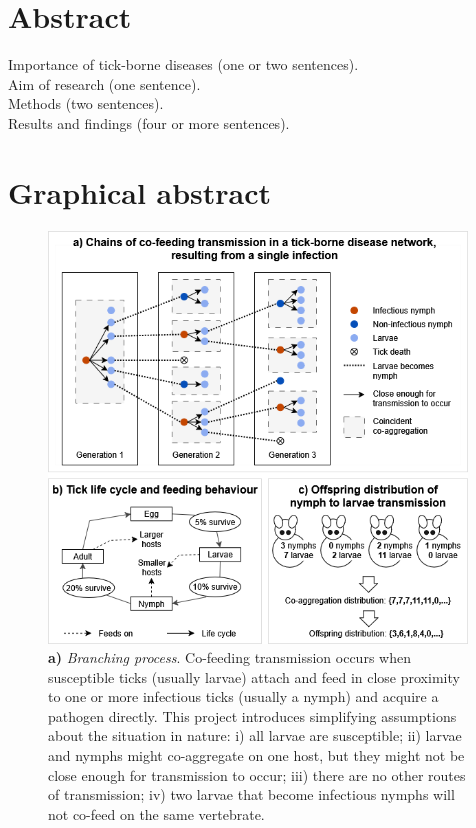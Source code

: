 \documentclass{article}
\begin{document}
\section*{Abstract}
Importance of tick-borne diseases (one or two sentences). \\
Aim of research (one sentence). \\
Methods (two sentences). \\
Results and findings (four or more sentences).

\newpage

\section*{Graphical abstract}

\begin{figure}[h!]
    \includegraphics[width=0.99\textwidth, center]{Images/graphical_abstract_mk2.drawio}
    \caption{
    \textbf{a)} \textit{Branching process}. Co-feeding transmission  occurs when susceptible ticks (usually larvae) attach and feed in close proximity to one or more infectious ticks (usually a nymph) and acquire a pathogen directly. This project introduces simplifying assumptions about the situation in nature: i) all larvae are susceptible; ii) larvae and nymphs might co-aggregate on one host, but they might not be close enough for transmission to occur; iii) there are no other routes of transmission; iv) two larvae that become infectious nymphs will not co-feed on the same vertebrate. \\ 
}
\end{figure}
\end{document}
